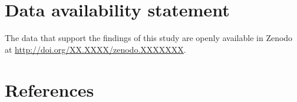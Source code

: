 \documentclass[aip,jcp,reprint,noshowkeys,superscriptaddress]{revtex4-1}
\begin{document}
\section*{Data availability statement}
The data that support the findings of this study are openly available in Zenodo at \href{http://doi.org/XX.XXXX/zenodo.XXXXXXX}{http://doi.org/XX.XXXX/zenodo.XXXXXXX}.

\section*{References}

\end{document}
